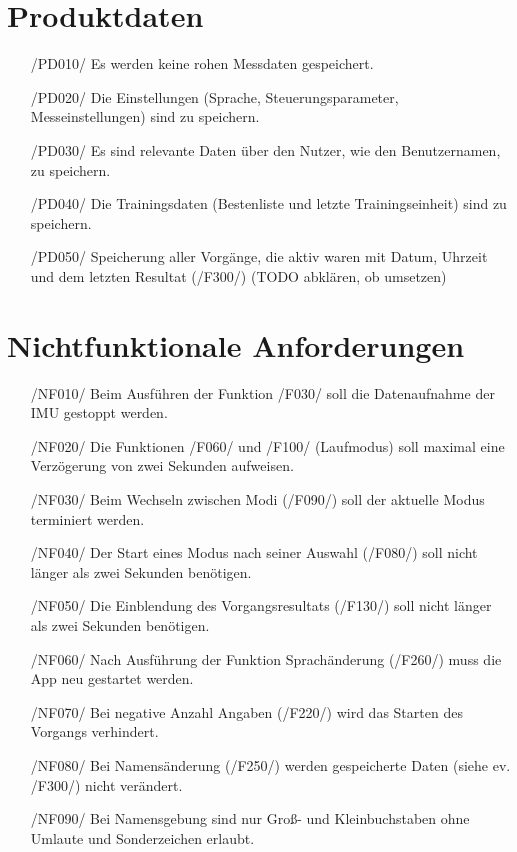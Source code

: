 \documentclass[a4paper,12pt]{article}
\begin{document}
\begin{itemize}
\section{Produktdaten}
\begin{itemize}
	\item[/PD010/] Es werden keine rohen Messdaten gespeichert.
	\item[/PD020/] Die Einstellungen (Sprache, Steuerungsparameter, Messeinstellungen) sind zu speichern. 
	\item[/PD030/] Es sind relevante Daten über den Nutzer, wie den Benutzernamen, zu speichern.
	\item[/PD040/] Die Trainingsdaten (Bestenliste und letzte Trainingseinheit) sind zu speichern. %
	\item[/PD050/] Speicherung aller Vorgänge, die aktiv waren mit Datum, Uhrzeit und dem letzten Resultat (/F300/) (TODO abklären, ob umsetzen)
\end{itemize}


\section{Nichtfunktionale Anforderungen}

\begin{itemize}
  \item[/NF010/] Beim Ausführen der Funktion /F030/ soll die Datenaufnahme der IMU gestoppt werden.
  \item[/NF020/] Die Funktionen /F060/ und /F100/ (Laufmodus) soll maximal eine Verzögerung von zwei Sekunden aufweisen. %
  \item[/NF030/] Beim Wechseln zwischen Modi (/F090/) soll der aktuelle Modus terminiert werden.
  \item[/NF040/] Der Start eines Modus nach seiner Auswahl (/F080/) soll nicht länger als zwei Sekunden benötigen.
  \item[/NF050/] Die Einblendung des Vorgangsresultats (/F130/) soll nicht länger als zwei Sekunden benötigen.
  \item[/NF060/] Nach Ausführung der Funktion  Sprachänderung (/F260/) muss die App neu gestartet werden.
  \item[/NF070/] Bei negative Anzahl Angaben (/F220/) wird das Starten des Vorgangs verhindert.
  \item[/NF080/] Bei Namensänderung (/F250/) werden gespeicherte Daten (siehe ev. /F300/) nicht verändert.
  \item[/NF090/] Bei Namensgebung sind nur Groß- und Kleinbuchstaben ohne Umlaute und Sonderzeichen erlaubt.
\end{itemize}

\end{itemize}
\end{document}
